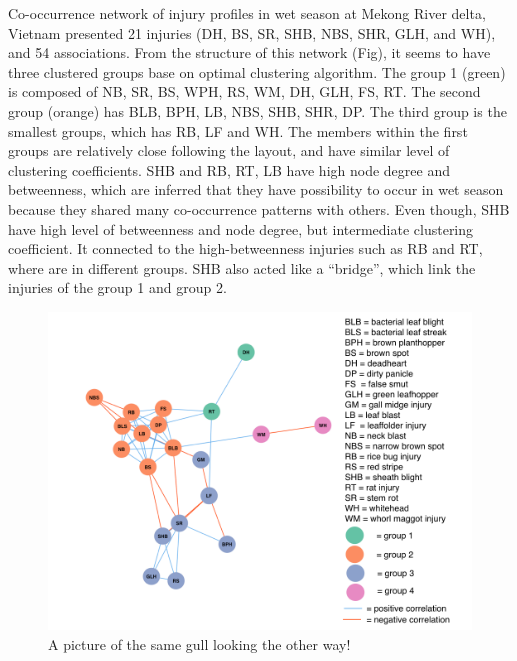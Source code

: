 Co-occurrence network of injury profiles in wet season at Mekong River delta, Vietnam presented 21 injuries (DH, BS, SR, SHB, NBS, SHR, GLH, and WH), and 54 associations. From the structure of this network (Fig), it seems to have three clustered groups base on optimal clustering algorithm. The group 1 (green) is composed of NB, SR, BS, WPH, RS, WM, DH, GLH, FS, RT. The second group (orange) has BLB, BPH, LB, NBS, SHB, SHR, DP. The third group is the smallest groups, which has RB, LF and WH. The members within the first groups are relatively close following the layout, and have similar level of clustering coefficients. SHB and RB, RT, LB have high node degree and betweenness, which are inferred that they have possibility to occur in wet season because they shared many co-occurrence patterns with others. Even though, SHB have high level of betweenness and node degree, but intermediate clustering coefficient.  It connected to the high-betweenness injuries such as RB and RT, where are in different groups. SHB also acted like a ``bridge'', which link the injuries of the group 1 and group 2.

%
%
\begin{figure}[p!]
\centerline{
      \includegraphics[width = 1\textwidth]{figures/idn_ds_net.png}
      }
  \caption{A picture of the same gull looking the other way!}
\end{figure}

